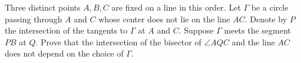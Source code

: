 Three distinct points $A, B, C$ are fixed on a line in this order. Let $\Gamma$ be a circle passing through $A$ and $C$ whose center does not lie on the line $AC$. Denote by $P$ the intersection of the tangents to $\Gamma$ at $A$ and $C$. Suppose $\Gamma$ meets the segment $PB$ at $Q$. Prove that the intersection of the bisector of $\angle AQC$ and the line $AC$ does not depend on the choice of $\Gamma$.
